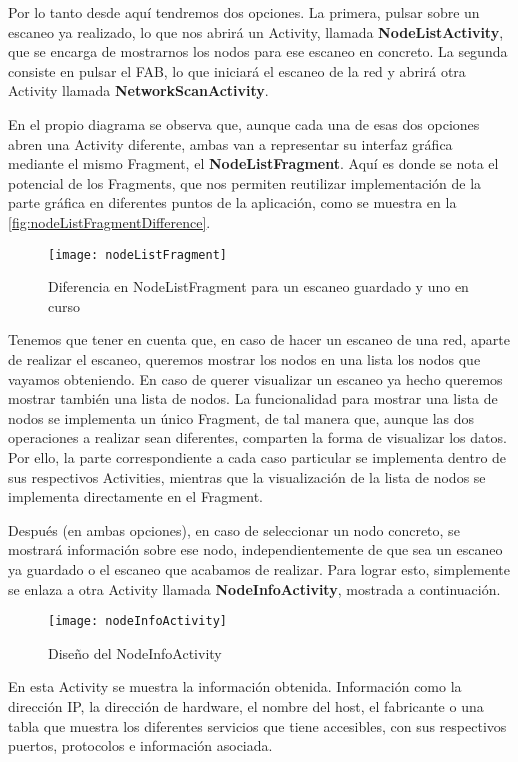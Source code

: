 Por lo tanto desde aquí tendremos dos opciones. La primera, pulsar sobre un escaneo ya realizado, lo que nos abrirá un Activity, llamada \textbf{NodeListActivity}, que se encarga de mostrarnos los nodos para ese escaneo en concreto. La segunda consiste en pulsar el FAB, lo que iniciará el escaneo de la red y abrirá otra Activity llamada \textbf{NetworkScanActivity}.

En el propio diagrama se observa que, aunque cada una de esas dos opciones abren una Activity diferente, ambas van a representar su interfaz gráfica mediante el mismo Fragment, el \textbf{NodeListFragment}. Aquí es donde se nota el potencial de los Fragments, que nos permiten reutilizar implementación de la parte gráfica en diferentes puntos de la aplicación, como se muestra en la \autoref{fig:nodeListFragmentDifference}.

\begin{figure}[H]
	\centering
	\texttt{[image: nodeListFragment]}
	\caption{Diferencia en NodeListFragment para un escaneo guardado y uno en curso}
	\label{fig:nodeListFragmentDifference}
\end{figure}

Tenemos que tener en cuenta que, en caso de hacer un escaneo de una red, aparte de realizar el escaneo, queremos mostrar los nodos en una lista los nodos que vayamos obteniendo. En caso de querer visualizar un escaneo ya hecho queremos mostrar también una lista de nodos. La funcionalidad para mostrar una lista de nodos se implementa un único Fragment, de tal manera que, aunque las dos operaciones a realizar sean diferentes, comparten la forma de visualizar los datos. Por ello, la parte correspondiente a cada caso particular se implementa dentro de sus respectivos Activities, mientras que la visualización de la lista de nodos se implementa directamente en el Fragment.

Después (en ambas opciones), en caso de seleccionar un nodo concreto, se mostrará información sobre ese nodo, independientemente de que sea un escaneo ya guardado o el escaneo que acabamos de realizar. Para lograr esto, simplemente se enlaza a otra Activity llamada \textbf{NodeInfoActivity}, mostrada a continuación.

\begin{figure}[H]
	\centering
	\texttt{[image: nodeInfoActivity]}
	\caption{Diseño del NodeInfoActivity}
	\label{fig:nodeInfoActivity}
\end{figure}

En esta Activity se muestra la información obtenida. Información como la dirección IP,  la dirección de hardware, el nombre del host, el fabricante o una tabla que muestra los diferentes servicios que tiene accesibles, con sus respectivos puertos, protocolos e información asociada.

